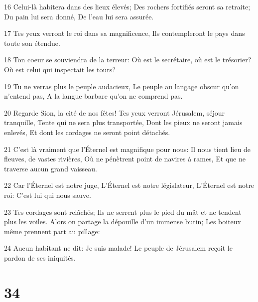 \par 16 Celui-là habitera dans des lieux élevés; Des rochers fortifiés seront sa retraite; Du pain lui sera donné, De l'eau lui sera assurée.
\par 17 Tes yeux verront le roi dans sa magnificence, Ils contempleront le pays dans toute son étendue.
\par 18 Ton coeur se souviendra de la terreur: Où est le secrétaire, où est le trésorier? Où est celui qui inspectait les tours?
\par 19 Tu ne verras plus le peuple audacieux, Le peuple au langage obscur qu'on n'entend pas, A la langue barbare qu'on ne comprend pas.
\par 20 Regarde Sion, la cité de nos fêtes! Tes yeux verront Jérusalem, séjour tranquille, Tente qui ne sera plus transportée, Dont les pieux ne seront jamais enlevés, Et dont les cordages ne seront point détachés.
\par 21 C'est là vraiment que l'Éternel est magnifique pour nous: Il nous tient lieu de fleuves, de vastes rivières, Où ne pénètrent point de navires à rames, Et que ne traverse aucun grand vaisseau.
\par 22 Car l'Éternel est notre juge, L'Éternel est notre législateur, L'Éternel est notre roi: C'est lui qui nous sauve.
\par 23 Tes cordages sont relâchés; Ils ne serrent plus le pied du mât et ne tendent plus les voiles. Alors on partage la dépouille d'un immense butin; Les boiteux même prennent part au pillage:
\par 24 Aucun habitant ne dit: Je suis malade! Le peuple de Jérusalem reçoit le pardon de ses iniquités.

\chapter{34}

